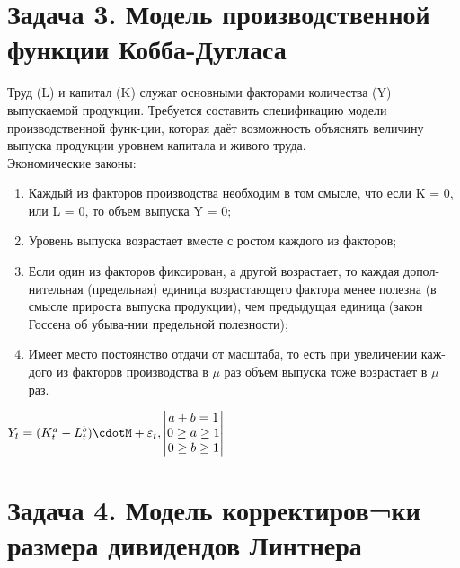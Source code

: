 \documentclass[11pt,a4paper]{article}
\begin{document}
  \newline
  \section{Задача 3. Модель производственной функции Кобба-Дугласа}\label{sec:task3}

Труд (L) и капитал (K) служат основными факторами количества (Y) выпускаемой продукции.
Требуется составить спецификацию модели производственной функ-ции, которая даёт возможность объяснять величину выпуска продукции уровнем капитала и живого труда.\\
  Экономические законы:
  \begin{enumerate}
    \item Каждый из факторов производства необходим в том смысле, что если K = 0, или L = 0, то объем выпуска Y = 0;
    \item Уровень выпуска возрастает вместе с ростом каждого из факторов;
    \item Если один из факторов фиксирован, а другой возрастает, то каждая допол-нительная (предельная) единица возрастающего фактора менее полезна (в смысле прироста выпуска продукции), чем предыдущая единица (закон Госсена об убыва-нии предельной полезности);
    \item Имеет место постоянство отдачи от масштаба, то есть при увеличении каж-дого из факторов производства в $\mu$ раз объем выпуска тоже возрастает в $\mu$ раз.
  \end{enumerate}

  \newline
  $Y_t=(K_t^a-L_t^b)\cdotM+\varepsilon_t, \space\space
  \begin{vmatrix}
      a + b = 1\\
      0 \geq a \geq 1\\
      0 \geq b \geq 1
  \end{vmatrix}$

  \section{Задача 4. Модель корректиров¬ки размера дивидендов Линтнера}\label{sec:task4}
\end{document}
